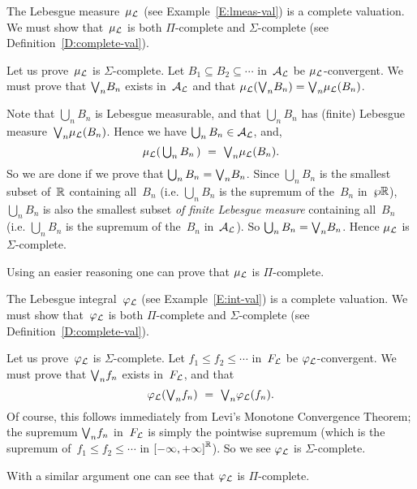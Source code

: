 \documentclass[main.tex]{subfiles}
\begin{document}
\begin{ex}
\label{E:lmeas-complete-val}
The Lebesgue measure~$\mu_{\mathcal{L}}$
(see Example~\ref{E:lmeas-val})
is a complete valuation.
We must show that~$\mu_{\mathcal{L}}$ is
both $\Pi$-complete and $\Sigma$-complete
(see Definition~\ref{D:complete-val}).

Let us prove~$\mu_{\mathcal{L}}$ is $\Sigma$-complete.
Let $B_1 \subseteq B_2 \subseteq \dotsb$ in~$\mathcal{A}_{\mathcal{L}}$
be $\mu_{\mathcal{L}}$-convergent.
We must prove that $\textstyle{\bigvee}_n B_n$ exists in~$\mathcal{A}_{\mathcal{L}}$
and that 
$\mu_{\mathcal{L}}(\textstyle{\bigvee}_n B_n) = \textstyle{\bigvee}_n \mu_{\mathcal{L}}(B_n)$.

Note that $\bigcup_n B_n$
is Lebesgue measurable,
and that  $\bigcup_n B_n$ has (finite) Lebesgue measure~$\textstyle{\bigvee}_n\mu_{\mathcal{L}}(B_n)$.
Hence we have $\bigcup_n B_n \in \mathcal{A}_{\mathcal{L}}$, and,
\begin{equation}
\label{eq:E:lmeas-complete-val-1}
\textstyle
\mu_{\mathcal{L}}(\,\bigcup_n B_n\,) \ =\  \textstyle{\bigvee}_n \mu_{\mathcal{L}}(B_n).
\end{equation}
So we are done if we prove that $\bigcup_n B_n = \textstyle{\bigvee}_n B_n$.
Since $\bigcup_n B_n$ is the smallest subset of~$\mathbb{R}$
containing all~$B_n$
(i.e. $\bigcup_n B_n$ is the supremum of the~$B_n$ in~$\wp \mathbb{R}$),
$\bigcup_n B_n$ is also the smallest
subset \emph{of finite Lebesgue measure} containing all~$B_n$
(i.e. $\bigcup_n B_n$ is the supremum of the~$B_n$ in~$\mathcal{A}_{\mathcal{L}}$).
So
 $\bigcup_n B_n = \textstyle{\bigvee}_n B_n$.
Hence $\mu_{\mathcal{L}}$ is $\Sigma$-complete.

Using an easier reasoning one can prove that $\mu_{\mathcal{L}}$
is $\Pi$-complete.
\end{ex}
%
%
\begin{ex}
\label{E:int-complete-val}
The Lebesgue integral~$\varphi_{\mathcal{L}}$
(see Example~\ref{E:int-val})
is a complete valuation.
We must show that~$\varphi_{\mathcal{L}}$ is
both $\Pi$-complete and $\Sigma$-complete
(see Definition~\ref{D:complete-val}).

Let us prove~$\varphi_{\mathcal{L}}$ is $\Sigma$-complete.
Let $f_1\leq f_2 \leq\dotsb$ in~$F_{\mathcal{L}}$
be $\varphi_{\mathcal{L}}$-convergent.
We must prove that $\textstyle{\bigvee}_n f_n$ exists in~$F_{\mathcal{L}}$,
and that 
\begin{equation*}
\varphi_{\mathcal{L}}(\textstyle{\bigvee}_n f_n) \ =\  \textstyle{\bigvee}_n \varphi_{\mathcal{L}}(f_n).
\end{equation*}
Of course,
this follows immediately from
Levi's Monotone Convergence Theorem;
the supremum $\textstyle{\bigvee}_n f_n$ in~$F_{\mathcal{L}}$ is simply
the pointwise supremum
(which is the supremum of~$f_1\leq f_2 \leq\dotsb$ in ${[-\infty,+\infty]}^{\mathbb{R}}$).
So we see $\varphi_{\mathcal{L}}$ is $\Sigma$-complete.

With a similar argument one can see that $\varphi_{\mathcal{L}}$ is $\Pi$-complete.
\end{ex}
\end{document}
